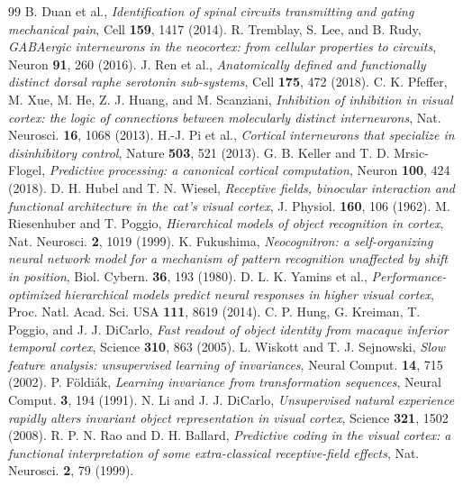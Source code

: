 \begin{thebibliography}{99}
 B. Duan et al., \emph{Identification of spinal circuits transmitting and gating mechanical pain}, Cell \textbf{159}, 1417 (2014).
 R. Tremblay, S. Lee, and B. Rudy, \emph{GABAergic interneurons in the neocortex: from cellular properties to circuits}, Neuron \textbf{91}, 260 (2016).
 J. Ren et al., \emph{Anatomically defined and functionally distinct dorsal raphe serotonin sub-systems}, Cell \textbf{175}, 472 (2018).
 C. K. Pfeffer, M. Xue, M. He, Z. J. Huang, and M. Scanziani, \emph{Inhibition of inhibition in visual cortex: the logic of connections between molecularly distinct interneurons}, Nat. Neurosci. \textbf{16}, 1068 (2013).
 H.-J. Pi et al., \emph{Cortical interneurons that specialize in disinhibitory control}, Nature \textbf{503}, 521 (2013).
 G. B. Keller and T. D. Mrsic-Flogel, \emph{Predictive processing: a canonical cortical computation}, Neuron \textbf{100}, 424 (2018).
 D. H. Hubel and T. N. Wiesel, \emph{Receptive fields, binocular interaction and functional architecture in the cat's visual cortex}, J. Physiol. \textbf{160}, 106 (1962).
 M. Riesenhuber and T. Poggio, \emph{Hierarchical models of object recognition in cortex}, Nat. Neurosci. \textbf{2}, 1019 (1999).
 K. Fukushima, \emph{Neocognitron: a self-organizing neural network model for a mechanism of pattern recognition unaffected by shift in position}, Biol. Cybern. \textbf{36}, 193 (1980).
 D. L. K. Yamins et al., \emph{Performance-optimized hierarchical models predict neural responses in higher visual cortex}, Proc. Natl. Acad. Sci. USA \textbf{111}, 8619 (2014).
 C. P. Hung, G. Kreiman, T. Poggio, and J. J. DiCarlo, \emph{Fast readout of object identity from macaque inferior temporal cortex}, Science \textbf{310}, 863 (2005).
 L. Wiskott and T. J. Sejnowski, \emph{Slow feature analysis: unsupervised learning of invariances}, Neural Comput. \textbf{14}, 715 (2002).
 P. F\"oldi\'ak, \emph{Learning invariance from transformation sequences}, Neural Comput. \textbf{3}, 194 (1991).
 N. Li and J. J. DiCarlo, \emph{Unsupervised natural experience rapidly alters invariant object representation in visual cortex}, Science \textbf{321}, 1502 (2008).
 R. P. N. Rao and D. H. Ballard, \emph{Predictive coding in the visual cortex: a functional interpretation of some extra-classical receptive-field effects}, Nat. Neurosci. \textbf{2}, 79 (1999).

\end{thebibliography}
